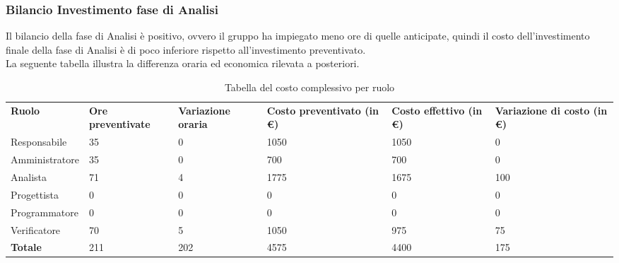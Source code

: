 \subsubsection{Bilancio Investimento fase di Analisi}
Il bilancio della fase di Analisi è positivo, ovvero il gruppo ha impiegato meno ore di quelle anticipate, quindi il costo dell'investimento finale della fase di Analisi è di poco inferiore rispetto all'investimento preventivato.\\
La seguente tabella illustra la differenza oraria ed economica rilevata a posteriori.
{
\renewcommand{\arraystretch}{2}
\begin{longtable}[h]{ C{2.5cm} C{2.5cm} C{2.5cm} C{2.5cm} C{1.5cm} C{2.5cm}}
\caption{Tabella del costo complessivo per ruolo}\\
\rowcolor{\primaryColor}

\textcolor{\secondaryColor}{\textbf{Ruolo}} & 
\textcolor{\secondaryColor}{\textbf{Ore preventivate}} & 
\textcolor{\secondaryColor}{\textbf{Variazione oraria}} & 
\textcolor{\secondaryColor}{\textbf{Costo preventivato (in \euro{})}} & 
\textcolor{\secondaryColor}{\textbf{Costo effettivo (in \euro{})}} & 
\textcolor{\secondaryColor}{\textbf{Variazione di costo (in \euro{})}}\\	
	
Responsabile    &  35 & 0 & 1050 & 1050 &  0 \\
Amministratore  &  35 & 0 & 700 & 700 & 0 \\
Analista        & 71 & 4 & 1775 & 1675 & 100 \\
Progettista     &   0 &   0 &    0 &  0 & 0 \\
Programmatore   &   0 &   0 &    0 &  0 & 0 \\
Verificatore    &  70 &  5 & 1050 & 975 & 75 \\
\textbf{Totale} & 211 & 202 & 4575 & 4400 & 175 \\	

\end{longtable}
}

